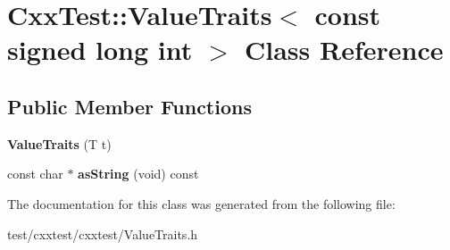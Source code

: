\hypertarget{classCxxTest_1_1ValueTraits_3_01const_01signed_01long_01int_01_4}{\section{Cxx\-Test\-:\-:Value\-Traits$<$ const signed long int $>$ Class Reference}
\label{classCxxTest_1_1ValueTraits_3_01const_01signed_01long_01int_01_4}
}
\subsection*{Public Member Functions}
\begin{DoxyCompactItemize}
\item 
\hypertarget{classCxxTest_1_1ValueTraits_3_01const_01signed_01long_01int_01_4_abb31a9ba99399d9494e04c3cc08ca4ea}{{\bfseries Value\-Traits} (T t)}\label{classCxxTest_1_1ValueTraits_3_01const_01signed_01long_01int_01_4_abb31a9ba99399d9494e04c3cc08ca4ea}

\item 
\hypertarget{classCxxTest_1_1ValueTraits_3_01const_01signed_01long_01int_01_4_ac74460bd9ea046d8b50937d71a9d4249}{const char $\ast$ {\bfseries as\-String} (void) const }\label{classCxxTest_1_1ValueTraits_3_01const_01signed_01long_01int_01_4_ac74460bd9ea046d8b50937d71a9d4249}

\end{DoxyCompactItemize}


The documentation for this class was generated from the following file\-:\begin{DoxyCompactItemize}
\item 
test/cxxtest/cxxtest/Value\-Traits.\-h\end{DoxyCompactItemize}
